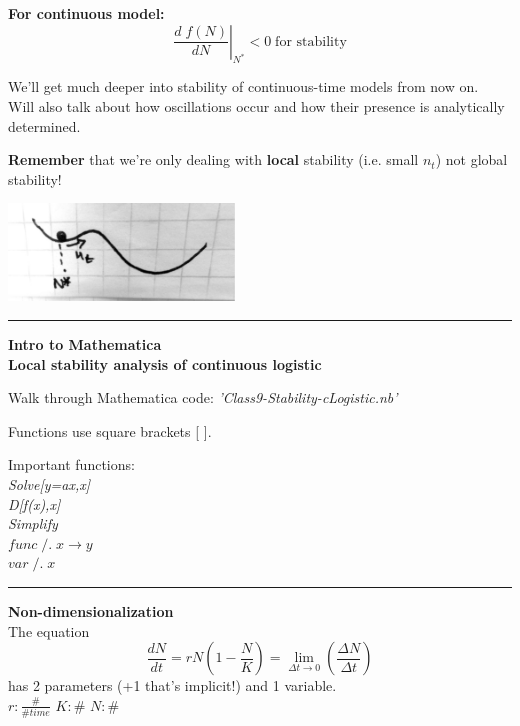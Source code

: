 \documentclass{article}
\newcommand{\note}[1]{\colorbox{gray!30}{#1}}
\newcommand{\ind}{\-\hspace{1cm}}
\begin{document}
\textbf{For continuous model:}\\
\begin{equation*}
\boxed{	\left.\frac{d\; f(N)}{dN} \right \vert_{N^*}<0  \; \text{for stability}}
\end{equation*}

We'll get much deeper into stability of continuous-time models from now on.  \\
Will also talk about how oscillations occur and how their presence is analytically determined. 

\vspace{1cm}
\textbf{Remember} that we're only dealing with \textbf{local} stability (i.e. small $n_t$) not global stability!
\begin{center}
\includegraphics[width=6cm]{figs/LocalStability.pdf}
\end{center}

\rule[0.5ex]{\linewidth}{1pt}

\textbf{Intro to Mathematica}\\
\ind \textbf{Local stability analysis of continuous logistic}

\begin{center}
\note{Walk through Mathematica code: \emph{'Class9-Stability-cLogistic.nb'}}
\end{center}

Functions use square brackets [ ].

Important functions:\\
\ind \emph{Solve[y=ax,x]}\\
\ind \emph{D[f(x),x]}\\
\ind \emph{Simplify}\\
\ind $func\; /. \; x \to y$\\ 
\ind $var\; /. \; x$\\


\rule[0.5ex]{\linewidth}{1pt}

\pagebreak

\textbf{Non-dimensionalization}\\
The equation
\begin{equation*}
	\frac{dN}{dt}=rN\left(1-\frac{N}{K}\right) = \lim_{\Delta t\to 0}\left(\frac{\Delta N}{\Delta t}\right)
\end{equation*}
has 2 parameters (+1 that's implicit!) and 1 variable.\\
\ind \ind $r : \frac{\#}{\# time}$
\ind \ind $K : \#$
\ind \ind $N : \#$
\end{document}
